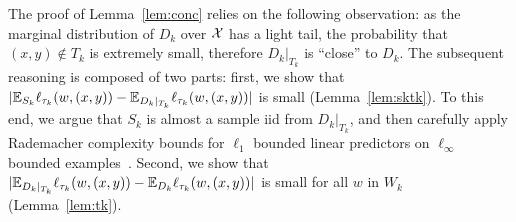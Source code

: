 The proof of Lemma~\ref{lem:conc} relies on the following observation: as the marginal distribution of $D_k$ over $\mathcal{X}$ has a light tail, the probability that $(x,y) \notin T_k$ is extremely small, therefore $D_k|_{T_k}$ is ``close'' to $D_k$.
The subsequent reasoning is composed of two parts: first, we show that $|\mathbb{E}_{S_k} \ell_{\tau_k}(w, (x, y)) - \mathbb{E}_{D_k |_{T_k}} \ell_{\tau_k}(w, (x, y))|$ is small (Lemma~\ref{lem:sktk}). To this end, we argue that $S_k$ is almost a sample iid from $D_k |_{T_k}$, and then carefully apply Rademacher complexity
bounds for $\ell_1$ bounded linear predictors on $\ell_\infty$ bounded examples~\citep{KST09}. Second, we show that $|\mathbb{E}_{D_k |_{T_k}} \ell_{\tau_k}(w, (x, y)) - \mathbb{E}_{D_k} \ell_{\tau_k}(w, (x, y)) |$ is small for all $w$ in $W_k$ (Lemma~\ref{lem:tk}).

